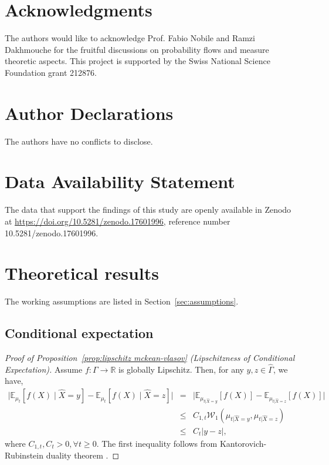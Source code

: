 \documentclass[11pt, a4paper, oneside, reqno]{amsart}
\begin{document}
\section*{Acknowledgments}
    \noindent The authors would like to acknowledge Prof. Fabio Nobile and Ramzi Dakhmouche for the fruitful discussions on probability flows and measure theoretic aspects.
    This project is supported by the Swiss National Science Foundation grant 212876.
\section*{Author Declarations}
\noindent The authors have no conflicts to disclose.


\section*{Data Availability Statement}
\noindent The data that support the findings of this study are openly available in Zenodo at \url{https://doi.org/10.5281/zenodo.17601996}, reference number 10.5281/zenodo.17601996.

\appendix

\section{Theoretical results}\label{app:proofs}
\noindent The working assumptions are listed in Section~\ref{sec:assumptions}.

\subsection{Conditional expectation}\label{app:condexp}
\begin{proof}[Proof of Proposition~\ref{prop:lipschitz mckean-vlasov} (Lipschitzness of Conditional Expectation)]
    Assume $f:\Gamma\to\mathbb{R}$ is globally Lipschitz. Then, for any $y,z\in\hat{\Gamma}$, we have,
    \begin{eqnarray}
        \big| \mathbb{E}_{\mu_t}[f(X)\mid \hat{X}=y] -  \mathbb{E}_{\mu_t}[f(X)\mid \hat{X}=z]\big| &=& \big| \mathbb{E}_{\mu_{t|\hat{X}=y}}[f(X)] -  \mathbb{E}_{\mu_{t|\hat{X}=z}}[f(X)]\big| \nonumber\\
        &\leq& C_{1,t}\mathcal{W}_1(\mu_{t|\hat{X}=y},\mu_{t|\hat{X}=z})\nonumber\\
        &\leq &C_t|y-z|,
    \end{eqnarray}
    where $C_{1,t},C_t>0, \forall t\geq 0$. The first inequality follows from Kantorovich-Rubinstein duality theorem \cite{Villani2009}.
\end{proof}
\end{document}
